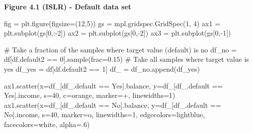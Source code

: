 \documentclass[
  letterpaper,
  DIV=11,
  numbers=noendperiod]{scrreprt}
\newenvironment{Shaded}{\begin{snugshade}}{\end{snugshade}}
\newcommand{\CommentTok}[1]{\textcolor[rgb]{0.37,0.37,0.37}{#1}}
\newcommand{\DecValTok}[1]{\textcolor[rgb]{0.68,0.00,0.00}{#1}}
\newcommand{\FloatTok}[1]{\textcolor[rgb]{0.68,0.00,0.00}{#1}}
\newcommand{\NormalTok}[1]{\textcolor[rgb]{0.00,0.23,0.31}{#1}}
\newcommand{\OperatorTok}[1]{\textcolor[rgb]{0.37,0.37,0.37}{#1}}
\newcommand{\StringTok}[1]{\textcolor[rgb]{0.13,0.47,0.30}{#1}}
\begin{document}
\textbf{Figure 4.1 (ISLR) - Default data set}

\begin{Shaded}
\begin{Highlighting}[]
\NormalTok{fig }\OperatorTok{=}\NormalTok{ plt.figure(figsize}\OperatorTok{=}\NormalTok{(}\DecValTok{12}\NormalTok{,}\DecValTok{5}\NormalTok{))}
\NormalTok{gs }\OperatorTok{=}\NormalTok{ mpl.gridspec.GridSpec(}\DecValTok{1}\NormalTok{, }\DecValTok{4}\NormalTok{)}
\NormalTok{ax1 }\OperatorTok{=}\NormalTok{ plt.subplot(gs[}\DecValTok{0}\NormalTok{,:}\OperatorTok{{-}}\DecValTok{2}\NormalTok{])}
\NormalTok{ax2 }\OperatorTok{=}\NormalTok{ plt.subplot(gs[}\DecValTok{0}\NormalTok{,}\OperatorTok{{-}}\DecValTok{2}\NormalTok{])}
\NormalTok{ax3 }\OperatorTok{=}\NormalTok{ plt.subplot(gs[}\DecValTok{0}\NormalTok{,}\OperatorTok{{-}}\DecValTok{1}\NormalTok{])}

\CommentTok{\# Take a fraction of the samples where target value (default) is \textquotesingle{}no\textquotesingle{}}
\NormalTok{df\_no }\OperatorTok{=}\NormalTok{ df[df.default2 }\OperatorTok{==} \DecValTok{0}\NormalTok{].sample(frac}\OperatorTok{=}\FloatTok{0.15}\NormalTok{)}
\CommentTok{\# Take all samples  where target value is \textquotesingle{}yes\textquotesingle{}}
\NormalTok{df\_yes }\OperatorTok{=}\NormalTok{ df[df.default2 }\OperatorTok{==} \DecValTok{1}\NormalTok{]}
\NormalTok{df\_ }\OperatorTok{=}\NormalTok{ df\_no.append(df\_yes)}

\NormalTok{ax1.scatter(x}\OperatorTok{=}\NormalTok{df\_[df\_.default }\OperatorTok{==} \StringTok{\textquotesingle{}Yes\textquotesingle{}}\NormalTok{].balance, y}\OperatorTok{=}\NormalTok{df\_[df\_.default }\OperatorTok{==} \StringTok{\textquotesingle{}Yes\textquotesingle{}}\NormalTok{].income, s}\OperatorTok{=}\DecValTok{40}\NormalTok{, c}\OperatorTok{=}\StringTok{\textquotesingle{}orange\textquotesingle{}}\NormalTok{, marker}\OperatorTok{=}\StringTok{\textquotesingle{}+\textquotesingle{}}\NormalTok{,}
\NormalTok{            linewidths}\OperatorTok{=}\DecValTok{1}\NormalTok{)}
\NormalTok{ax1.scatter(x}\OperatorTok{=}\NormalTok{df\_[df\_.default }\OperatorTok{==} \StringTok{\textquotesingle{}No\textquotesingle{}}\NormalTok{].balance, y}\OperatorTok{=}\NormalTok{df\_[df\_.default }\OperatorTok{==} \StringTok{\textquotesingle{}No\textquotesingle{}}\NormalTok{].income, s}\OperatorTok{=}\DecValTok{40}\NormalTok{, marker}\OperatorTok{=}\StringTok{\textquotesingle{}o\textquotesingle{}}\NormalTok{, linewidths}\OperatorTok{=}\DecValTok{1}\NormalTok{,}
\NormalTok{            edgecolors}\OperatorTok{=}\StringTok{\textquotesingle{}lightblue\textquotesingle{}}\NormalTok{, facecolors}\OperatorTok{=}\StringTok{\textquotesingle{}white\textquotesingle{}}\NormalTok{, alpha}\OperatorTok{=}\FloatTok{.6}\NormalTok{)}


\end{Highlighting}
\end{Shaded}
\end{document}
